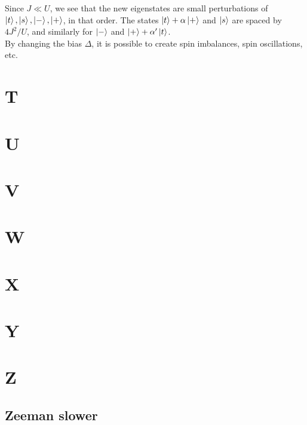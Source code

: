 \documentclass{book}
\theoremstyle{definition}
\newcommand{\al}{\alpha}
\begin{document}
Since $J \ll U$, we see that the new eigenstates are small perturbations of $\ket{t},\ket{s},\ket{-},\ket{+}$, in that order. The states $\ket{t}+\al\ket{+}$ and $\ket{s}$ are spaced by $4J^2/U$, and similarly for $\ket{-}$ and $\ket{+}+ \al'\ket{t}$.  \\



By changing the bias $\Delta$, it is possible to create spin imbalances, spin oscillations, etc. 











\chapter*{T}
\chapter*{U}
\chapter*{V}
\chapter*{W}
\chapter*{X}
\chapter*{Y}
\chapter*{Z}



\section*{Zeeman slower}



\newpage

 

\end{document}
